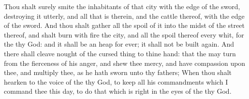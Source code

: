 \begin{biblechapter}
\verse Thou shalt surely smite the inhabitants of that city with the edge of the sword, destroying it utterly, and all that is therein, and the cattle thereof, with the edge of the sword.
\verse And thou shalt gather all the spoil of it into the midst of the street thereof, and shalt burn with fire the city, and all the spoil thereof every whit, for the \LORD thy God: and it shall be an heap for ever; it shall not be built again.
\verse And there shall cleave nought of the cursed thing to thine hand: that the \LORD may turn from the fierceness of his anger, and shew thee mercy, and have compassion upon thee, and multiply thee, as he hath sworn unto thy fathers;
\verse When thou shalt hearken to the voice of the \LORD thy God, to keep all his commandments which I command thee this day, to do that which is right in the eyes of the \LORD thy God.
\end{biblechapter}

